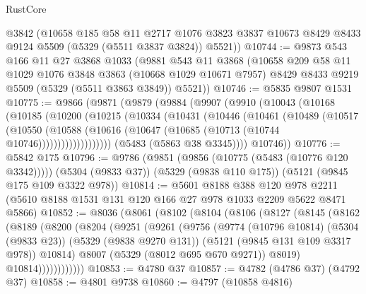 \begin{lexlean}{RustCore}
\begin{coremodule}
      @3842
      (@10658
        @185
        @58
        @11
        @2717
        @1076
        @3823
        @3837
        @10673
        @8429
        @8433
        @9124
        @5509
        (@5329 (@5511 @3837 @3824))
        @5521))
@10744 := @9873
    @543
    @166
    @11
    @27
    @3868
    @1033
    (@9881
      @543
      @11
      @3868
      (@10658
        @209
        @58
        @11
        @1029
        @1076
        @3848
        @3863
        (@10668 @1029 @10671 @7957)
        @8429
        @8433
        @9219
        @5509
        (@5329 (@5511 @3863 @3849))
        @5521))
@10746 := @5835 @9807 @1531
@10775 := @9866
    (@9871
      (@9879
        (@9884
          (@9907
            (@9910
              (@10043
                (@10168
                  (@10185
                    (@10200
                      (@10215
                        (@10334
                          (@10431
                            (@10446
                              (@10461
                                (@10489
                                  (@10517
                                    (@10550
                                      (@10588
                                        (@10616
                                          (@10647 (@10685 (@10713 (@10744 @10746)))))))))))))))))))
            (@5483 (@5863 @38 @3345))))
        @10746))
@10776 := @5842 @175
@10796 := @9786
    (@9851 (@9856 (@10775 (@5483 (@10776 @120 @3342)))))
    (@5304 (@9833 @37))
    (@5329 (@9838 @110 @175))
    (@5121 (@9845 @175 @109 @3322 @978))
@10814 := @5601
    @8188
    @388
    @120
    @978
    @2211
    (@5610 @8188 @1531 @131 @120 @166 @27 @978 @1033 @2209 @5622 @8471 @5866)
@10852 := @8036
    (@8061
      (@8102
        (@8104
          (@8106
            (@8127
              (@8145
                (@8162
                  (@8189
                    (@8200
                      (@8204
                        (@9251
                          (@9261
                            (@9756
                              (@9774
                                (@10796 @10814)
                                (@5304 (@9833 @23))
                                (@5329 (@9838 @9270 @131))
                                (@5121 (@9845 @131 @109 @3317 @978))
                                @10814)
                              @8007
                              (@5329 (@8012 @695 @670 @9271))
                              @8019)
                            @10814))))))))))))
@10853 := @4780 @37
@10857 := @4782 (@4786 @37) (@4792 @37)
@10858 := @4801 @9738
@10860 := @4797 (@10858 @4816)

\end{coremodule}
\end{lexlean}
